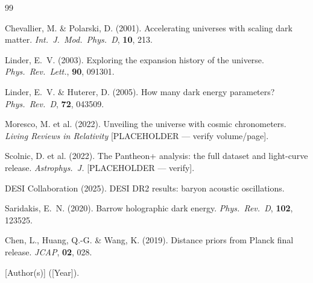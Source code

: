 \documentclass[11pt]{article}
\begin{document}

\begin{thebibliography}{99}

Chevallier, M. \& Polarski, D. (2001).
\newblock Accelerating universes with scaling dark matter.
\newblock \emph{Int.\ J.\ Mod.\ Phys.\ D}, \textbf{10}, 213.

Linder, E.~V. (2003).
\newblock Exploring the expansion history of the universe.
\newblock \emph{Phys.\ Rev.\ Lett.}, \textbf{90}, 091301.

Linder, E.~V. \& Huterer, D. (2005).
\newblock How many dark energy parameters?
\newblock \emph{Phys.\ Rev.\ D}, \textbf{72}, 043509.

Moresco, M. et al. (2022).
\newblock Unveiling the universe with cosmic chronometers.
\newblock \emph{Living Reviews in Relativity} [PLACEHOLDER --- verify volume/page].

Scolnic, D. et al. (2022).
\newblock The Pantheon+ analysis: the full dataset and light-curve release.
\newblock \emph{Astrophys.\ J.} [PLACEHOLDER --- verify].

DESI Collaboration (2025).
\newblock DESI DR2 results: baryon acoustic oscillations.

Saridakis, E.~N. (2020).
\newblock Barrow holographic dark energy.
\newblock \emph{Phys.\ Rev.\ D}, \textbf{102}, 123525.

Chen, L., Huang, Q.-G. \& Wang, K. (2019).
\newblock Distance priors from Planck final release.
\newblock \emph{JCAP}, \textbf{02}, 028.

[Author(s)] ([Year]).

\end{thebibliography}
\end{document}
